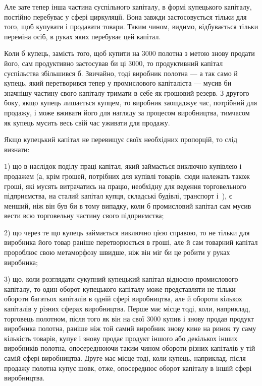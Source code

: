 Але зате тепер інша частина суспільного капіталу, в формі
купецького капіталу, постійно перебуває у сфері циркуляції.
Вона завжди застосовується тільки для того, щоб купувати
і продавати товари. Таким чином, видимо, відбувається тільки
переміна осіб, в руках яких перебуває цей капітал.

Коли б купець, замість того, щоб купити на 3000 полотна з метою знову продати його, сам продуктивно
застосував би ці 3000, то продуктивний капітал
суспільства збільшився б. Звичайно, тоді виробник полотна —
а так само й купець, який перетворився тепер у промислового
капіталіста — мусив би значнішу частину свого капіталу тримати
в себе як грошовий резерв. З другого боку, якщо купець
лишається купцем, то виробник заощаджує час, потрібний
для продажу, і може вживати його для нагляду за процесом
виробництва, тимчасом як купець мусить весь свій час уживати
для продажу.

Якщо купецький капітал не перевищує своїх необхідних пропорцій,
то слід визнати:

1) що в наслідок поділу праці капітал, який займається виключно
купівлею і продажем (а, крім грошей, потрібних для
купівлі товарів, сюди належать також гроші, які мусять витрачатись
на працю, необхідну для ведення торговельного підприємства,
на сталий капітал купця, складські будівлі, транспорт
і~), є менший, ніж він був би в тому випадку, коли б промисловий
капітал сам мусив вести всю торговельну частину
свого підприємства;

2) що через те що купець займається виключно цією справою,
то не тільки для виробника його товар раніше перетворюється
в гроші, але й сам товарний капітал пророблює свою
метаморфозу швидше, ніж він міг би це робити у руках виробника;

3) що, коли розглядати сукупний купецький капітал відносно
промислового капіталу, то один оборот купецького капіталу
може представляти не тільки обороти багатьох капіталів в одній
сфері виробництва, але й обороти кількох капіталів у різних
сферах виробництва. Перше має місце тоді, коли, наприклад,
торговець полотном, після того як він на свої 3000 купив і знову продав продукт виробника полотна,
раніше ніж той самий виробник знову кине на ринок ту саму
кількість товарів, купує і знову продає продукт іншого або декількох
інших виробників полотна, опосереднюючи таким чином
обороти різних капіталів у тій самій сфері виробництва. Друге
має місце тоді, коли купець, наприклад, після продажу полотна
купує шовк, отже, опосереднює оборот капіталу в іншій сфері
виробництва.

